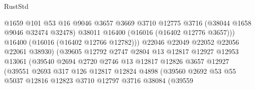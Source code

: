 \begin{lexlean}{RustStd}
\begin{coremodule}
                                      @1659
                                      @101
                                      @53
                                      @16
                                      @9046
                                      @3657
                                      @3669
                                      @3710
                                      @12775
                                      @3716
                                      (@38044 @1658 @9046 @32474 @32478)
                                      @38011
                                      @16400
                                      (@16016 (@16402 @12776 @3657)))
                                    @16400
                                    (@16016 (@16402 @12766 @12782)))
                                  @22046
                                  @22049
                                  @22052
                                  @22056
                                  @22061
                                  @38930)
                                (@39605
                                  @12792
                                  @2747
                                  @2804
                                  @13
                                  @12817
                                  @12927
                                  @12953
                                  @13061
                                  (@39540
                                    @2694
                                    @2720
                                    @2746
                                    @13
                                    @12817
                                    @12826
                                    @3657
                                    @12927
                                    (@39551
                                      @2693
                                      @317
                                      @126
                                      @12817
                                      @12824
                                      @4898
                                      (@39560
                                        @2692
                                        @53
                                        @55
                                        @5037
                                        @12816
                                        @12823
                                        @3710
                                        @12797
                                        @3716
                                        @38084
                                        (@39559

\end{coremodule}
\end{lexlean}
